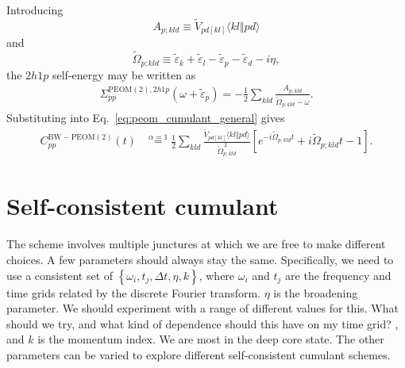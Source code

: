 Introducing
\begin{equation}
A_{p;kld}
\equiv
\tilde{V}_{pd[kl]}
\langle kl \Vert pd \rangle
\end{equation}
and
\begin{equation}
\tilde{\Omega}_{p;kld}
\equiv
\tilde{\varepsilon}_k
+
\tilde{\varepsilon}_l
-
\tilde{\varepsilon}_p
-
\tilde{\varepsilon}_d
-
i\eta,
\end{equation}
the $2h1p$ self-energy may be written as
\begin{align}
\Sigma_{pp}^{\mathrm{PEOM(2)},2h1p}
(\omega+\tilde{\varepsilon}_p)
=
-\frac{1}{2}
\sum_{kld}
\frac{
A_{p;kld}
}{
\tilde{\Omega}_{p;kld}-\omega
}.
\label{eq:peom_2h1p_self_energy}
\end{align}
Substituting into
Eq.~\eqref{eq:peom_cumulant_general} gives
\begin{align}
C_{pp}^{\mathrm{BW-PEOM(2)}}(t)
&\overset{\alpha=1}{=}
\frac{1}{2}
\sum_{kld}
\frac{
\tilde{V}_{pd[kl]}
\langle kl\Vert pd\rangle
}{
\tilde{\Omega}_{p;kld}^{\,2}
}
\left[
e^{-i\tilde{\Omega}_{p;kld}t}
+
i\tilde{\Omega}_{p;kld}t
-
1
\right]
.
\label{eq:bw_peom_cumulant_alpha1}
\end{align}
\section{Self-consistent cumulant}
The scheme involves multiple junctures at which we are free to make different choices. A few parameters should always stay the same. Specifically, we need to use a consistent set of $\left\{\omega_i, t_j, \Delta t, \eta, k\right\}$, where $\omega_i$ and $t_j$ are the frequency and time grids related by the discrete Fourier transform. $\eta$ is the broadening parameter. We should experiment with a range of different values for this. What should we try, and what kind of dependence should this have on my time grid? , and $k$ is the momentum index. We are most in the deep core state. The other parameters can be varied to explore different self-consistent cumulant schemes.
